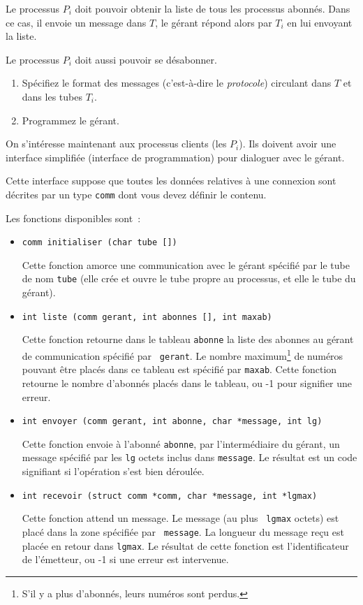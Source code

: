 Le processus $P_i$ doit pouvoir obtenir la liste de tous les processus
abonnés. Dans ce cas, il envoie un message dans $T$, le gérant répond
alors par $T_i$ en lui envoyant la liste.

Le processus $P_i$ doit aussi pouvoir se désabonner.

\begin {enumerate}
    \item Spécifiez le format des messages (c'est-à-dire le {\em
	protocole}) circulant dans $T$ et dans les tubes $T_i$.

    \item Programmez le gérant.

\end {enumerate}


\question

On s'intéresse maintenant aux processus clients (les $P_i$). Ils
doivent avoir une interface simplifiée (interface de programmation)
pour dialoguer avec le gérant.

Cette interface suppose que toutes les données relatives à une
connexion sont décrites par un type {\tt comm} dont vous devez
définir le contenu.

Les fonctions disponibles sont~:

\begin {itemize}

    \item \verb:comm initialiser (char tube []):

	Cette fonction amorce une communication avec le gérant spécifié
	par le tube de nom {\tt tube} (elle crée et ouvre le tube propre
	au processus, et elle le tube du gérant).

    \item \verb:int liste (comm gerant, int abonnes [], int maxab):

	Cette fonction retourne dans le tableau {\tt abonne} la liste
	des abonnes au gérant de communication spécifié par {\tt
	gerant}.  Le nombre maximum\footnote {S'il y a plus d'abonnés,
	leurs numéros sont perdus.} de numéros pouvant être placés dans
	ce tableau est spécifié par {\tt maxab}. Cette fonction retourne
	le nombre d'abonnés placés dans le tableau, ou -1 pour signifier
	une erreur.
    
    \item \verb:int envoyer (comm gerant, int abonne, char *message, int lg):

	Cette fonction envoie à l'abonné {\tt abonne}, par
	l'intermédiaire du gérant, un message spécifié par les {\tt lg}
	octets inclus dans {\tt message}.  Le résultat est un code
	signifiant si l'opération s'est bien déroulée.

    \item \verb:int recevoir (struct comm *comm, char *message, int *lgmax):

	Cette fonction attend un message. Le message (au plus {\tt
	lgmax} octets) est placé dans la zone spécifiée par {\tt
	message}. La longueur du message reçu est placée en retour dans
	{\tt lgmax}. Le résultat de cette fonction est l'identificateur
	de l'émetteur, ou -1 si une erreur est intervenue.

\end {itemize}

